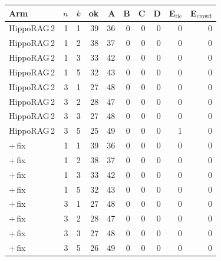\begin{tabular}{lrr rrrrrrr}
\toprule
Arm & $n$ & $k$ & ok & A & B & C & D & E$_\text{tie}$ & E$_\text{crowd}$ \\
\midrule
HippoRAG\,2 & 1 & 1 & 39 & 36 & 0 & 0 & 0 & 0 & 0 \\
HippoRAG\,2 & 1 & 2 & 38 & 37 & 0 & 0 & 0 & 0 & 0 \\
HippoRAG\,2 & 1 & 3 & 33 & 42 & 0 & 0 & 0 & 0 & 0 \\
HippoRAG\,2 & 1 & 5 & 32 & 43 & 0 & 0 & 0 & 0 & 0 \\
HippoRAG\,2 & 3 & 1 & 27 & 48 & 0 & 0 & 0 & 0 & 0 \\
HippoRAG\,2 & 3 & 2 & 28 & 47 & 0 & 0 & 0 & 0 & 0 \\
HippoRAG\,2 & 3 & 3 & 27 & 48 & 0 & 0 & 0 & 0 & 0 \\
HippoRAG\,2 & 3 & 5 & 25 & 49 & 0 & 0 & 0 & 1 & 0 \\
+\,fix & 1 & 1 & 39 & 36 & 0 & 0 & 0 & 0 & 0 \\
+\,fix & 1 & 2 & 38 & 37 & 0 & 0 & 0 & 0 & 0 \\
+\,fix & 1 & 3 & 33 & 42 & 0 & 0 & 0 & 0 & 0 \\
+\,fix & 1 & 5 & 32 & 43 & 0 & 0 & 0 & 0 & 0 \\
+\,fix & 3 & 1 & 27 & 48 & 0 & 0 & 0 & 0 & 0 \\
+\,fix & 3 & 2 & 28 & 47 & 0 & 0 & 0 & 0 & 0 \\
+\,fix & 3 & 3 & 27 & 48 & 0 & 0 & 0 & 0 & 0 \\
+\,fix & 3 & 5 & 26 & 49 & 0 & 0 & 0 & 0 & 0 \\
\bottomrule
\end{tabular}
